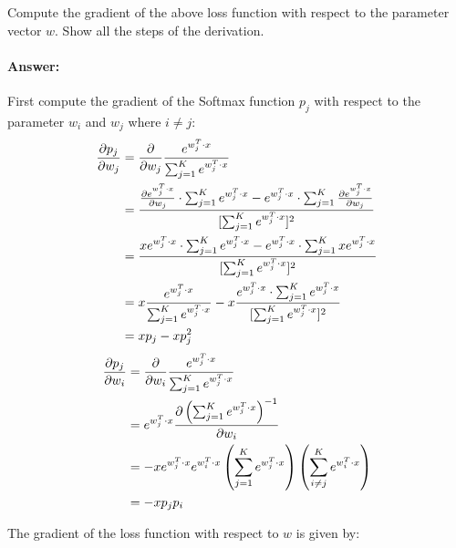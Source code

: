 \documentclass[10pt]{article}
\begin{document}
Compute the gradient of the above loss function with respect to the parameter vector $w$. Show all the steps of the derivation.

\paragraph{Answer:} First compute the gradient of the Softmax function $p_j$ with respect to the parameter $w_i$ and $w_j$ where $i\neq j$:
\begin{align*}
  \pdv{p_j}{w_j} &=\pdv{}{w_j}\frac{e^{w_{j}^{T} \cdot x}}{\sum_{j=1}^{K} e^{w_{j}^{T} \cdot x}}\\
  &=\frac{\pdv{e^{w_{j}^{T} \cdot x}}{w_j}\cdot \sum_{j=1}^{K} e^{w_{j}^{T} \cdot x}-e^{w_{j}^{T} \cdot x} \cdot \sum_{j=1}^{K} \pdv{e^{w_{j}^{T} \cdot x}}{w_j}}{[\sum_{j=1}^{K} e^{w_{j}^{T} \cdot x}]^2}\\
  &=\frac{x e^{w_{j}^{T} \cdot x } \cdot \sum_{j=1}^{K} e^{w_{j}^{T} \cdot x}-e^{w_{j}^{T} \cdot x} \cdot \sum_{j=1}^{K} x e^{w_{j}^{T} \cdot x }}{[\sum_{j=1}^{K} e^{w_{j}^{T} \cdot x}]^2}\\
  &=x\frac{e^{w_{j}^{T} \cdot x }}{\sum_{j=1}^{K} e^{w_{j}^{T} \cdot x}}- x \frac{e^{w_{j}^{T} \cdot x} \cdot \sum_{j=1}^{K} e^{w_{j}^{T} \cdot x }}{[\sum_{j=1}^{K} e^{w_{j}^{T} \cdot x}]^2}\\
  &=x p_{j}- x p^2_{j}\\
\end{align*}
\begin{align*}
  \pdv{p_j}{w_i} &=\pdv{}{w_i}\frac{e^{w_{j}^{T} \cdot x}}{\sum_{j=1}^{K} e^{w_{j}^{T} \cdot x}}\\
  &=e^{w_{j}^{T} \cdot x} \pdv{\left(\sum_{j=1}^{K} e^{w_{j}^{T} \cdot x}\right)^{-1}}{w_i}\\
  &=- x e^{w_{j}^{T} \cdot x} e^{w_{i}^{T} \cdot x} \left(\sum_{j=1}^{K} e^{w_{j}^{T} \cdot x}\right)\left(\sum_{i\neq j}^{K} e^{w_{i}^{T} \cdot x}\right)\\
  &=-x p_j p_i
\end{align*}

The gradient of the loss function with respect to $w$ is given by:
\end{document}
